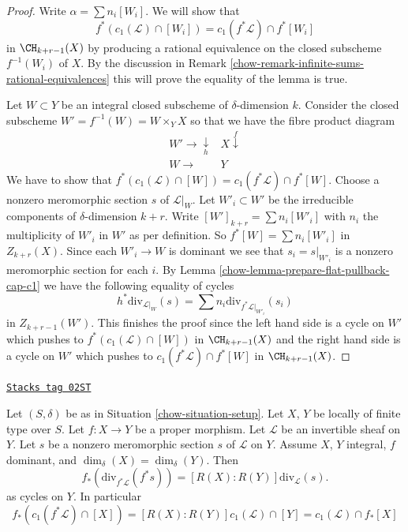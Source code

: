 \begin{proof}

Write $\alpha = \sum n_i[W_i]$. We will show that
$$
f^*(c_1(\mathcal{L}) \cap [W_i]) = c_1(f^*\mathcal{L}) \cap f^*[W_i]
$$
in $\CH_{k + r - 1}(X)$ by producing a rational equivalence
on the closed subscheme $f^{-1}(W_i)$ of $X$.
By the discussion in
Remark \ref{chow-remark-infinite-sums-rational-equivalences}
this will prove the equality of the lemma is true.

\medskip\noindent
Let $W \subset Y$ be an integral closed subscheme of $\delta$-dimension $k$.
Consider the closed subscheme $W' = f^{-1}(W) = W \times_Y X$
so that we have the fibre product diagram
$$
\begin{array}{cc}W' \longrightarrow\underset{h}{\downarrow} & X \overset{f}{\downarrow} \\ W \longrightarrow & Y\end{array}
$$
We have to show that
$f^*(c_1(\mathcal{L}) \cap [W]) = c_1(f^*\mathcal{L}) \cap f^*[W]$.
Choose a nonzero meromorphic section $s$ of $\mathcal{L}|_W$.
Let $W'_i \subset W'$ be the irreducible components of
$\delta$-dimension $k + r$. Write $[W']_{k + r} = \sum n_i[W'_i]$
with $n_i$ the multiplicity of $W'_i$ in $W'$ as per definition.
So $f^*[W] = \sum n_i[W'_i]$ in $Z_{k + r}(X)$.
Since each $W'_i \to W$ is dominant we
see that $s_i = s|_{W'_i}$ is a nonzero meromorphic section for
each $i$. By Lemma \ref{chow-lemma-prepare-flat-pullback-cap-c1}
we have the following equality of cycles
$$
h^*\text{div}_{\mathcal{L}|_W}(s) =
\sum n_i\text{div}_{f^*\mathcal{L}|_{W'_i}}(s_i)
$$
in $Z_{k + r - 1}(W')$. This finishes the proof since
the left hand side is a cycle on $W'$ which pushes to
$f^*(c_1(\mathcal{L}) \cap [W])$ in $\CH_{k + r - 1}(X)$
and the right hand side is a cycle on $W'$ which pushes to
$c_1(f^*\mathcal{L}) \cap f^*[W]$ in $\CH_{k + r - 1}(X)$.
\end{proof}

\begin{lemma}
\label{chow-lemma-equal-c1-as-cycles}
\href{https://stacks.math.columbia.edu/tag/02ST}{\texttt{Stacks tag 02ST}}

Let $(S, \delta)$ be as in Situation \ref{chow-situation-setup}.
Let $X$, $Y$ be locally of finite type over $S$.
Let $f : X \to Y$ be a proper morphism.
Let $\mathcal{L}$ be an invertible sheaf on $Y$.
Let $s$ be a nonzero meromorphic section $s$ of $\mathcal{L}$ on $Y$.
Assume $X$, $Y$ integral, $f$ dominant, and $\dim_\delta(X) = \dim_\delta(Y)$.
Then
$$
f_*\left(\text{div}_{f^*\mathcal{L}}(f^*s)\right) =
[R(X) : R(Y)]\text{div}_\mathcal{L}(s).
$$
as cycles on $Y$. In particular
$$
f_*(c_1(f^*\mathcal{L}) \cap [X]) =
[R(X) : R(Y)] c_1(\mathcal{L}) \cap [Y] =
c_1(\mathcal{L}) \cap f_*[X]
$$
\end{lemma}

